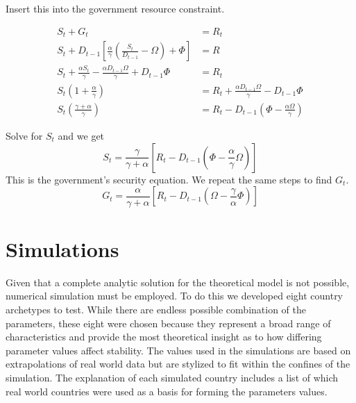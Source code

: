 \documentclass[12pt]{article}
\begin{document}
\begin{spacing}{1.5}
\noindent Insert this into the government resource constraint. 

\begin{equation}
    \begin{aligned}
        S_t+G_t&=R_t \\
        S_t+  D_{t-1}\left[\frac{\alpha}{\gamma } \left(\frac{S_t}{ D_{t-1}} -\Omega \right) +\Phi \right]  &= R \\
S_t+ \frac{\alpha S_t}{\gamma } -\frac{\alpha  D_{t-1} \Omega}{\gamma } +D_{t-1}\Phi &=R_t \\
S_t\left(1+\frac{\alpha}{\gamma }\right) &= R_t+ \frac{\alpha D_{t-1} \Omega}{\gamma } - D_{t-1}\Phi \\
S_t\left(\frac{\gamma  + \alpha}{\gamma }\right) &= R_t - D_{t-1} \left(\Phi - \frac{\alpha  \Omega}{\gamma } \right) 
    \end{aligned}
\end{equation}

\noindent Solve for $S_t$ and we get
\begin{equation}
S_t=\frac{\gamma }{\gamma  +\alpha} \left[ R_t - D_{t-1} \left(\Phi - \frac{\alpha}{\gamma }\Omega \right) \right]
\end{equation}
\noindent This is the government's security equation. We repeat the same steps to find $G_t$. 
\begin{equation}
G_t=\frac{\alpha}{\gamma  +\alpha} \left[ R_t - D_{t-1} \left(\Omega - \frac{\gamma }{\alpha}\Phi \right) \right]
\end{equation}


\section{Simulations} 


Given that a complete analytic solution for the theoretical model is not possible, numerical simulation must be employed. To do this we developed eight country archetypes to test. While there are endless possible combination of the parameters, these eight were chosen because they represent a broad range of characteristics and provide the most theoretical insight as to how differing parameter values affect stability. The values used in the simulations are based on extrapolations of real world data but are stylized to fit within the confines of the simulation. The explanation of each simulated country includes a list of which real world countries were used as a basis for forming the parameters values. 


\end{spacing}
\end{document}
